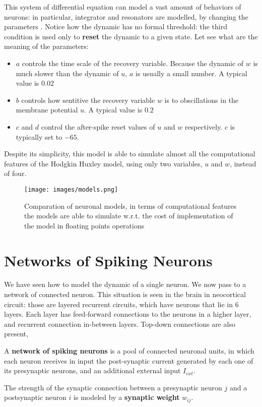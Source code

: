 \documentclass[oneside]{book}
\theoremstyle{definition}
\theoremstyle{plain}
\begin{document}
This system of differential equation can model a vast amount of behaviors of neurons: in particular, integrator and resonators are modelled, by changing the parameters . 
Notice how the dynamic has no formal threshold: the third condition is used only to \textbf{reset} the dynamic to a given state. 
Let see what are the meaning of the parameters:
\begin{itemize}
    \item $a$ controls the time scale of the recovery variable. Because the dynamic of $w$ is much slower than the dynamic of $u$, $a$ is usually a small number. A typical value is $0.02$
    \item $b$ controls how sentitive the recovery variable $w$ is to obscillations in the membrane potential $u$. A typical value is $0.2$
    \item $c$ and $d$ control the after-spike reset values of $u$ and $w$ respectively.  $c$ is typically set to $-65$.
\end{itemize}
Despite its simplicity, this model is able to simulate almost all the computational features of the Hodgkin Huxley model, using only two variables, $u$ and $w$, instead of four.
\begin{figure}
    \centering
    \texttt{[image: images/models.png]}
    \caption{Comparation of neuronal models, in terms of computational features the models are able to simulate w.r.t. the cost of implementation of the model in floating points operations}
    \label{fig:enter-label}
\end{figure}

\section{Networks of Spiking Neurons}
We have seen how to model the dynamic of a single neuron. We now pass to a network of connected neuron. This situation is seen in the brain in neocortical circuit: those are layered recurrent circuits, which have neurons that lie in 6 layers. Each layer has feed-forward connections to the neurons in a higher layer, and recurrent connection in-between layers. Top-down connections are also present,

A \textbf{network of spiking neurons} is a pool of connected neuronal units, in which each neuron receives in input the post-synaptic current generated by each one of its presynaptic neurons, and an additional external input $I_{ext}$.

The strength of the synaptic connection between a presynaptic neuron $j$ and a postsynaptic neuron $i$ is modeled by a \textbf{synaptic weight} $w_{ij}$.
\end{document}
